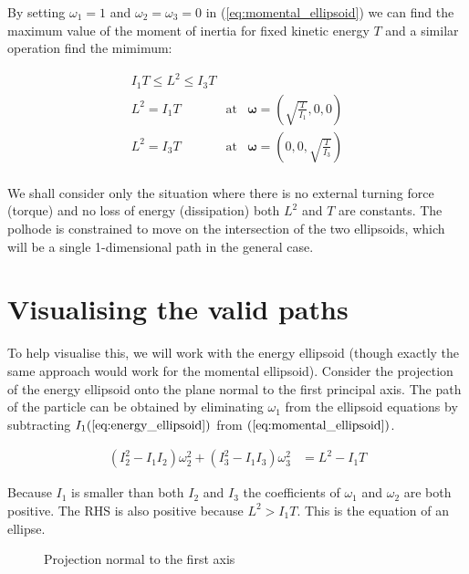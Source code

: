 \documentclass[a4paper, 12pt]{article}
\begin{document}
By setting $\omega_1=1$ and $\omega_2=\omega_3=0$ in (\ref{eq:momental_ellipsoid}) we can find the maximum value of the moment of inertia for fixed kinetic energy $T$ and a similar operation find the mimimum:

\begin{eqnarray*}
  I_1T \leq L^2 \leq I_3 T \\
  L^2=I_1T & \textrm{at} & \mathbf{\omega}=(\sqrt{\frac{T}{I_1}}, 0, 0) \\
  L^2=I_3T & \textrm{at} & \mathbf{\omega}=(0, 0, \sqrt{\frac{T}{I_3}}) \label{eq:maxlvalue}\\
\end{eqnarray*}

We shall consider only the situation where there is no external turning force (torque) and no loss of energy (dissipation) both $L^2$ and $T$ are constants. The polhode is constrained to move on the intersection of the two ellipsoids, which will be a single 1-dimensional path in the general case.

\section{Visualising the valid paths}


To help visualise this, we will work with the energy ellipsoid (though exactly the same approach would work for the momental ellipsoid). Consider the projection of the energy ellipsoid onto the plane normal to the first principal axis. The path of the particle can be obtained by eliminating $\omega_1$ from the ellipsoid equations by subtracting $I_1(\ref{eq:energy_ellipsoid})$ from $(\ref{eq:momental_ellipsoid})$.

\begin{align}
  (I_2^2 - I_1I_2)\omega_2^2 + (I_3^2-I_1I_3)\omega_3^2 & = L^2 - I_1T\label{eq:momell23}
\end{align}

Because $I_1$ is smaller than both $I_2$ and $I_3$ the coefficients of $\omega_1$ and $\omega_2$ are both positive. The RHS is also positive because $L^2 > I_1T$. This is the equation of an ellipse.

\begin{figure}[H]
  
  \begin{center}
    \begin{tikzpicture}[scale=1.4]%
      
    \end{tikzpicture}
  \end{center}
  \caption{Projection normal to the first axis}
  \label{fig:proj1}
\end{figure}
\end{document}
